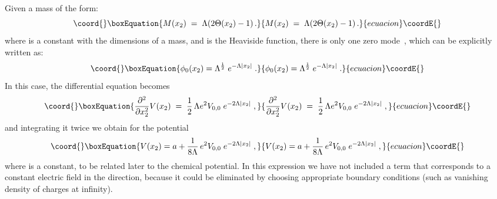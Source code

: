 \documentclass[a4paper,12pt]{article}
\begin{document}
{{\begin{itemize}
 Given a mass of the form:
\begin{equation}\coord{}\boxEquation{
M(x_2)\;=\;\Lambda (2\Theta (x_2)-1)\,.
}{
M(x_2)\;=\;\Lambda (2\Theta (x_2)-1)\,.
}{ecuacion}\coordE{}\end{equation}
where \myHighlight{$\Lambda$}\coordHE{} is a constant with the dimensions of a mass, and
\myHighlight{$\Theta$}\coordHE{} is the Heaviside function, there is only one zero
mode~\cite{p1}, which can be explicitly written as:
\begin{equation}\coord{}\boxEquation{
\phi_0(x_2)=\Lambda^{\frac{1}{2}}\;e^{-\Lambda|x_2|}\;.
}{
\phi_0(x_2)=\Lambda^{\frac{1}{2}}\;e^{-\Lambda|x_2|}\;.
}{ecuacion}\coordE{}\end{equation}
In this case, the differential equation becomes
\begin{equation}\coord{}\boxEquation{
   \label{eq:g1}
\frac{\partial^2}{\partial x_2^2}V(x_2)\;=\;\frac{1}{2} \, \Lambda
e^2 V_{0,0}\; e^{-2\Lambda|x_2|}\;,
}{
   \frac{\partial^2}{\partial x_2^2}V(x_2)\;=\;\frac{1}{2} \, \Lambda
e^2 V_{0,0}\; e^{-2\Lambda|x_2|}\;,
}{ecuacion}\coordE{}\end{equation}
and integrating it twice we obtain for the potential \coordHE{}
\begin{equation}\coord{}\boxEquation{
\label{vx2}
V(x_2)=a+\frac{1}{8 \Lambda}\, e^2 V_{0,0}\; e^{-2\Lambda|x_2|}\;,
}{
V(x_2)=a+\frac{1}{8 \Lambda}\, e^2 V_{0,0}\; e^{-2\Lambda|x_2|}\;,
}{ecuacion}\coordE{}\end{equation}
where \coordHE{} is a constant, to be related later to the chemical
potential.  In this expression we have not included a term that
corresponds to a constant electric field in the \coordHE{} direction,
because it could be eliminated by choosing appropriate boundary
conditions (such as vanishing density of charges at infinity).


\end{itemize}}}
\end{document}
